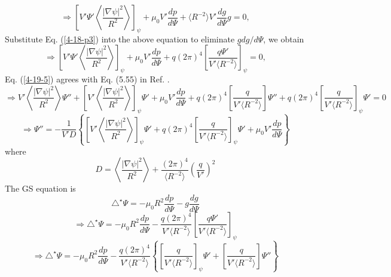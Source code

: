 \documentclass{article}
\begin{document}
\begin{equation}
  \Rightarrow \left[ V' \Psi' \left\langle \frac{| \nabla \psi |^2}{R^2}
  \right\rangle \right]_{\psi} + \mu_0 V' \frac{d p}{d \Psi} + \langle R^{- 2}
  \rangle V' \frac{d g}{d \Psi} g = 0,
\end{equation}
Substitute Eq. (\ref{4-18-p3}) into the above equation to eliminate $g d g / d
\Psi$, we obtain
\begin{equation}
  \label{4-19-5} \Rightarrow \left[ V' \Psi' \left\langle \frac{| \nabla \psi
  |^2}{R^2} \right\rangle \right]_{\psi} + \mu_0 V' \frac{d p}{d \Psi} + q (2
  \pi)^4 \left[ \frac{q \Psi'}{V' \langle R^{- 2} \rangle} \right]_{\psi} = 0,
\end{equation}
Eq. (\ref{4-19-5}) agrees with Eq. (5.55) in Ref. {\cite{jardin2010}}.
\begin{equation}
  \Rightarrow V' \left\langle \frac{| \nabla \psi |^2}{R^2} \right\rangle
  \Psi'' + \left[ V' \left\langle \frac{| \nabla \psi |^2}{R^2} \right\rangle
  \right]_{\psi} \Psi' + \mu_0 V' \frac{d p}{d \Psi} + q (2 \pi)^4 \left[
  \frac{q}{V' \langle R^{- 2} \rangle} \right] \Psi'' + q (2 \pi)^4 \left[
  \frac{q}{V' \langle R^{- 2} \rangle} \right]_{\psi} \Psi' = 0
\end{equation}
\begin{equation}
  \label{1-2-4} \Rightarrow \Psi'' = - \frac{1}{V' D} \left\{ \left[ V'
  \left\langle \frac{| \nabla \psi |^2}{R^2} \right\rangle \right]_{\psi}
  \Psi' + q (2 \pi)^4 \left[ \frac{q}{V' \langle R^{- 2} \rangle}
  \right]_{\psi} \Psi' + \mu_0 V' \frac{d p}{d \Psi} \right\}
\end{equation}
where
\begin{equation}
  D = \left\langle \frac{| \nabla \psi |^2}{R^2} \right\rangle + \frac{(2
  \pi)^4}{\langle R^{- 2} \rangle} \left( \frac{q}{V'} \right)^2
\end{equation}
The GS equation is
\begin{equation}
  \triangle^{\star} \Psi = - \mu_0 R^2 \frac{d p}{d \Psi} - g \frac{d g}{d
  \Psi}
\end{equation}
\begin{equation}
  \Rightarrow \triangle^{\star} \Psi = - \mu_0 R^2 \frac{d p}{d \Psi} -
  \frac{q (2 \pi)^4}{V' \langle R^{- 2} \rangle} \left[ \frac{q \Psi'}{V'
  \langle R^{- 2} \rangle} \right]_{\psi}
\end{equation}
\begin{equation}
  \Rightarrow \triangle^{\star} \Psi = - \mu_0 R^2 \frac{d p}{d \Psi} -
  \frac{q (2 \pi)^4}{V' \langle R^{- 2} \rangle} \left\{ \left[ \frac{q}{V'
  \langle R^{- 2} \rangle} \right]_{\psi} \Psi' + \left[ \frac{q}{V' \langle
  R^{- 2} \rangle} \right] \Psi'' \right\}
\end{equation}
\end{document}
